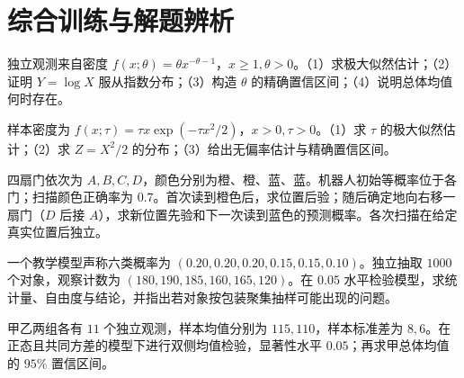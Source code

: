 \clearpage\section{综合训练与解题辨析}

\begin{exercise}[帕累托模型从估计到区间]\label{q:M-F-5}
独立观测来自密度 $f(x;\theta)=\theta x^{-\theta-1}$，$x\ge1,\theta>0$。（1）求极大似然估计；（2）证明 $Y=\log X$ 服从指数分布；（3）构造 $\theta$ 的精确置信区间；（4）说明总体均值何时存在。\par{}\end{exercise}

\begin{exercise}[瑞利参数与变换统计量]\label{q:M-PF-26}
样本密度为 $f(x;\tau)=\tau x\exp(-\tau x^2/2)$，$x>0,\tau>0$。（1）求 $\tau$ 的极大似然估计；（2）求 $Z=X^2/2$ 的分布；（3）给出无偏率估计与精确置信区间。\par{}\end{exercise}

\begin{exercise}[定位中的连续更新与预测]\label{q:M-F-7}
四扇门依次为 $A,B,C,D$，颜色分别为橙、橙、蓝、蓝。机器人初始等概率位于各门；扫描颜色正确率为 $0.7$。首次读到橙色后，求位置后验；随后确定地向右移一扇门（$D$ 后接 $A$），求新位置先验和下一次读到蓝色的预测概率。各次扫描在给定真实位置后独立。\par{}\end{exercise}

\begin{exercise}[六类别概率的综合检验]\label{q:M-F-8}
一个教学模型声称六类概率为 $(0.20,0.20,0.20,0.15,0.15,0.10)$。独立抽取 $1000$ 个对象，观察计数为 $(180,190,185,\allowbreak160,165,120)$。在 $0.05$ 水平检验模型，求统计量、自由度与结论，并指出若对象按包装聚集抽样可能出现的问题。\par{}\end{exercise}

\begin{exercise}[两样本检验的完整流程]\label{q:M-F-9}
甲乙两组各有 $11$ 个独立观测，样本均值分别为 $115,110$，样本标准差为 $8,6$。在正态且共同方差的模型下进行双侧均值检验，显著性水平 $0.05$；再求甲总体均值的 $95\%$ 置信区间。\par{}\end{exercise}

